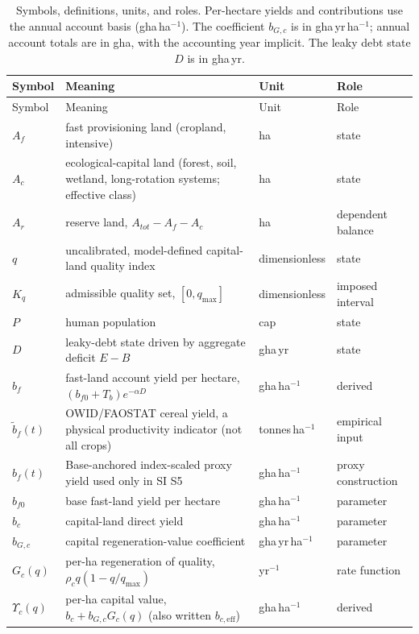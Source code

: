 \documentclass[11pt,a4paper]{article}
\newcommand{\Ups}{\Upsilon_c}
\begin{document}
\begin{longtable}{>{\raggedright\arraybackslash}p{}>{\raggedright\arraybackslash}p{}>{\raggedright\arraybackslash}p{}>{\raggedright\arraybackslash}p{}}
\caption{Symbols, definitions, units, and roles. Per-hectare yields and contributions use the annual account basis (gha\,ha$^{-1}$). The coefficient $b_{G,c}$ is in gha\,yr\,ha$^{-1}$; annual account totals are in gha, with the accounting year implicit. The leaky debt state $D$ is in gha\,yr.}\label{tab:si_symbols}\\
\toprule
Symbol & Meaning & Unit & Role \\
\midrule
\endfirsthead
\toprule
Symbol & Meaning & Unit & Role \\
\midrule
\endhead
$A_f$ & fast provisioning land (cropland, intensive) & ha & state \\
$A_c$ & ecological-capital land (forest, soil, wetland, long-rotation systems; effective class) & ha & state \\
$A_r$ & reserve land, $A_{tot}-A_f-A_c$ & ha & dependent balance \\
$q$ & uncalibrated, model-defined capital-land quality index & dimensionless & state \\
$K_q$ & admissible quality set, $[0,q_{\max}]$ & dimensionless & imposed interval \\
$P$ & human population & cap & state \\
$D$ & leaky-debt state driven by aggregate deficit $E-B$ & gha\,yr & state \\
$b_f$ & fast-land account yield per hectare, $(b_{f0}+T_b)e^{-\alpha D}$ & gha\,ha$^{-1}$ & derived \\
$\tilde b_f(t)$ & OWID/FAOSTAT cereal yield, a physical productivity indicator (not all crops) & tonnes\,ha$^{-1}$ & empirical input \\
$\hat b_f(t)$ & Base-anchored index-scaled proxy yield used only in SI S5 & gha\,ha$^{-1}$ & proxy construction \\
$b_{f0}$ & base fast-land yield per hectare & gha\,ha$^{-1}$ & parameter \\
$b_c$ & capital-land direct yield & gha\,ha$^{-1}$ & parameter \\
$b_{G,c}$ & capital regeneration-value coefficient & gha\,yr\,ha$^{-1}$ & parameter \\
$G_c(q)$ & per-ha regeneration of quality, $\rho_cq(1-q/q_{\max})$ & yr$^{-1}$ & rate function \\
$\Ups(q)$ & per-ha capital value, $b_c+b_{G,c}G_c(q)$ (also written $b_{c,\mathrm{eff}}$) & gha\,ha$^{-1}$ & derived \\

\end{longtable}
\end{document}
